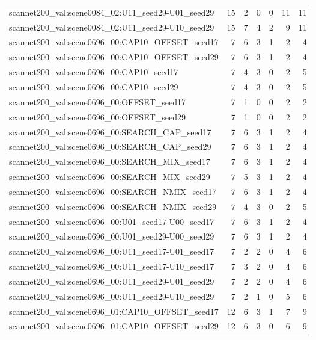 \begin{table}[t]
\begin{tabular}{lrrrrrr}
scannet200\_val:scene0084\_02:U11\_seed29-U01\_seed29 & 15 & 2 & 0 & 0 & 11 & 11 \\
scannet200\_val:scene0084\_02:U11\_seed29-U10\_seed29 & 15 & 7 & 4 & 2 & 9 & 11 \\
scannet200\_val:scene0696\_00:CAP10\_OFFSET\_seed17 & 7 & 6 & 3 & 1 & 2 & 4 \\
scannet200\_val:scene0696\_00:CAP10\_OFFSET\_seed29 & 7 & 6 & 3 & 1 & 2 & 4 \\
scannet200\_val:scene0696\_00:CAP10\_seed17 & 7 & 4 & 3 & 0 & 2 & 5 \\
scannet200\_val:scene0696\_00:CAP10\_seed29 & 7 & 4 & 3 & 0 & 2 & 5 \\
scannet200\_val:scene0696\_00:OFFSET\_seed17 & 7 & 1 & 0 & 0 & 2 & 2 \\
scannet200\_val:scene0696\_00:OFFSET\_seed29 & 7 & 1 & 0 & 0 & 2 & 2 \\
scannet200\_val:scene0696\_00:SEARCH\_CAP\_seed17 & 7 & 6 & 3 & 1 & 2 & 4 \\
scannet200\_val:scene0696\_00:SEARCH\_CAP\_seed29 & 7 & 6 & 3 & 1 & 2 & 4 \\
scannet200\_val:scene0696\_00:SEARCH\_MIX\_seed17 & 7 & 6 & 3 & 1 & 2 & 4 \\
scannet200\_val:scene0696\_00:SEARCH\_MIX\_seed29 & 7 & 5 & 3 & 1 & 2 & 4 \\
scannet200\_val:scene0696\_00:SEARCH\_NMIX\_seed17 & 7 & 6 & 3 & 1 & 2 & 4 \\
scannet200\_val:scene0696\_00:SEARCH\_NMIX\_seed29 & 7 & 4 & 3 & 0 & 2 & 5 \\
scannet200\_val:scene0696\_00:U01\_seed17-U00\_seed17 & 7 & 6 & 3 & 1 & 2 & 4 \\
scannet200\_val:scene0696\_00:U01\_seed29-U00\_seed29 & 7 & 6 & 3 & 1 & 2 & 4 \\
scannet200\_val:scene0696\_00:U11\_seed17-U01\_seed17 & 7 & 2 & 2 & 0 & 4 & 6 \\
scannet200\_val:scene0696\_00:U11\_seed17-U10\_seed17 & 7 & 3 & 2 & 0 & 4 & 6 \\
scannet200\_val:scene0696\_00:U11\_seed29-U01\_seed29 & 7 & 2 & 2 & 0 & 4 & 6 \\
scannet200\_val:scene0696\_00:U11\_seed29-U10\_seed29 & 7 & 2 & 1 & 0 & 5 & 6 \\
scannet200\_val:scene0696\_01:CAP10\_OFFSET\_seed17 & 12 & 6 & 3 & 1 & 7 & 9 \\
scannet200\_val:scene0696\_01:CAP10\_OFFSET\_seed29 & 12 & 6 & 3 & 0 & 6 & 9 \\

\end{tabular}
\end{table}
